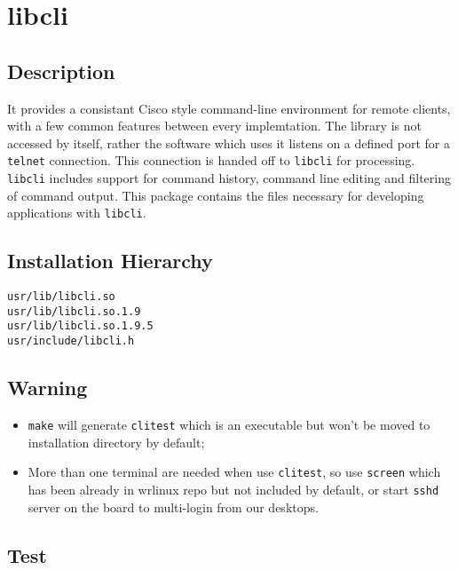 \documentclass[a4paper]{report}
\begin{document}
\chapter{libcli}
\section{Description}
It provides a consistant Cisco style command-line environment for remote clients, 
with a few common features between every implemtation. The library is not 
accessed by itself, rather the software which uses it listens on a defined port for a 
{\tt telnet} connection. This connection is handed off to {\tt libcli} for processing.
{\tt libcli} includes support for command history, command line editing and 
filtering of command output. This package contains the files necessary for 
developing applications with {\tt libcli}.
\section{Installation Hierarchy}
\begin{lstlisting}
usr/lib/libcli.so
usr/lib/libcli.so.1.9
usr/lib/libcli.so.1.9.5
usr/include/libcli.h
\end{lstlisting}
\section{Warning}
\begin{itemize}
    \item {\tt make} will generate {\tt clitest} which is an executable but won't be
          moved to installation directory by default;
    \item More than one terminal are needed when use {\tt clitest}, so use {\tt screen}
          which has been already in wrlinux repo but not included by default, or start
          {\tt sshd} server on the board to multi-login from our desktops.
\end{itemize}
\section{Test}
\end{document}
